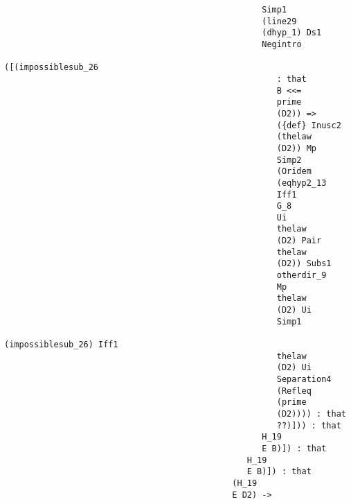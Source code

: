 \documentclass[12pt]{article}
\begin{document}
\begin{verbatim}
                                                    Simp1 
                                                    (line29 
                                                    (dhyp_1) Ds1 
                                                    Negintro 
                                                    ([(impossiblesub_26 
                                                       : that 
                                                       B <<= 
                                                       prime 
                                                       (D2)) => 
                                                       ({def} Inusc2 
                                                       (thelaw 
                                                       (D2)) Mp 
                                                       Simp2 
                                                       (Oridem 
                                                       (eqhyp2_13 
                                                       Iff1 
                                                       G_8 
                                                       Ui 
                                                       thelaw 
                                                       (D2) Pair 
                                                       thelaw 
                                                       (D2)) Subs1 
                                                       otherdir_9 
                                                       Mp 
                                                       thelaw 
                                                       (D2) Ui 
                                                       Simp1 
                                                       (impossiblesub_26) Iff1 
                                                       thelaw 
                                                       (D2) Ui 
                                                       Separation4 
                                                       (Refleq 
                                                       (prime 
                                                       (D2)))) : that 
                                                       ??)])) : that 
                                                    H_19 
                                                    E B)]) : that 
                                                 H_19 
                                                 E B)]) : that 
                                              (H_19 
                                              E D2) -> 

\end{verbatim}
\end{document}
